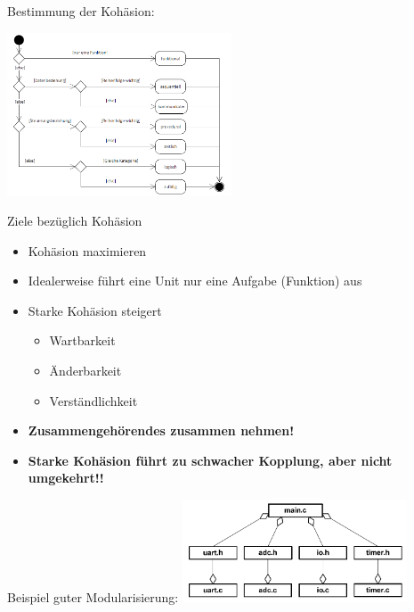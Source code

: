 Bestimmung der Kohäsion:
\begin{center}
{\includegraphics[width=0.5\textwidth]{images/Modularisierung/Kohaesionsbestimmung.png}}
\end{center}
Ziele bezüglich Kohäsion
\begin{itemize}
  \item Kohäsion maximieren
  \item Idealerweise führt eine Unit nur eine Aufgabe (Funktion) aus
  \item Starke Kohäsion steigert
  \begin{itemize}
    \item Wartbarkeit
    \item Änderbarkeit
    \item Verständlichkeit
  \end{itemize}
  \item \textbf{Zusammengehörendes zusammen nehmen!}
  \item \textbf{Starke Kohäsion führt zu schwacher Kopplung, aber nicht umgekehrt!!}
\end{itemize}
\begin{center}
Beispiel guter Modularisierung:
{\includegraphics[width=0.5\textwidth]{images/Modularisierung/GutesBeispielModularisierung.png}}
\end{center}